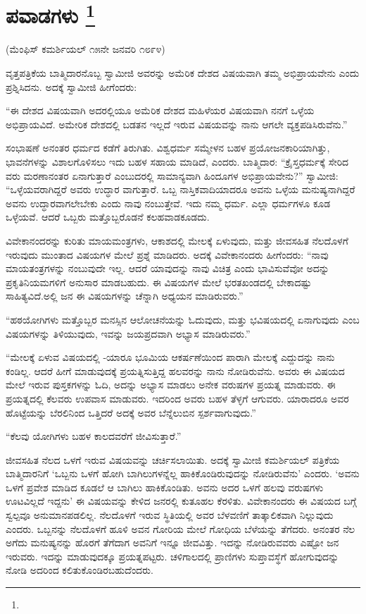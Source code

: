 
\chapter[ಪವಾಡಗಳು ]{ಪವಾಡಗಳು \protect\footnote{}}

\centerline{(ಮೆಂಫಿಸ್​ ಕಮರ್ಶಿಯಲ್​ ೧೫ನೇ ಜನವರಿ ೧೮೯೪)}

ವೃತ್ತಪತ್ರಿಕೆಯ ಬಾತ್ಮಿದಾರನೊಬ್ಬ ಸ್ವಾಮೀಜಿ ಅವರನ್ನು ಅಮೆರಿಕ ದೇಶದ ವಿಷಯವಾಗಿ ತಮ್ಮ ಅಭಿಪ್ರಾಯವೇನು ಎಂದು ಪ್ರಶ್ನಿಸಿದನು. ಅದಕ್ಕೆ ಸ್ವಾಮೀಜಿ ಹೀಗೆಂದರು:

“ಈ ದೇಶದ ವಿಷಯವಾಗಿ ಅದರಲ್ಲಿಯೂ ಅಮೆರಿಕ ದೇಶದ ಮಹಿಳೆಯರ ವಿಷಯವಾಗಿ ನನಗೆ ಒಳ್ಳೆಯ ಅಭಿಪ್ರಾಯವಿದೆ. ಅಮೇರಿಕ ದೇಶದಲ್ಲಿ ಬಡತನ ಇಲ್ಲದೆ ಇರುವ ವಿಷಯವನ್ನು ನಾನು ಆಗಲೇ ವ್ಯಕ್ತಪಡಿಸಿರುವೆನು.”

ಸಂಭಾಷಣೆ ಅನಂತರ ಧರ್ಮದ ಕಡೆಗೆ ತಿರುಗಿತು. ವಿಶ್ವಧರ್ಮ ಸಮ್ಮೇಳನ ಬಹಳ ಪ್ರಯೋಜನಕಾರಿಯಾಗಿತ್ತು, ಭಾವನೆಗಳನ್ನು ವಿಶಾಲಗೊಳಿಸಲು ಇದು ಬಹಳ ಸಹಾಯ ಮಾಡಿದೆ, ಎಂದರು. ಬಾತ್ಮಿದಾರ: “ಕ್ರೈಸ್ತಧರ್ಮಕ್ಕೆ ಸೇರಿದ ವರು ಮರಣಾನಂತರ ಏನಾಗುತ್ತಾರೆ ಎಂಬುದರಲ್ಲಿ ಸಾಮಾನ್ಯವಾಗಿ ಹಿಂದೂಗಳ ಅಭಿಪ್ರಾಯವೇನು?” ಸ್ವಾಮೀಜಿ: “ಒಳ್ಳೆಯವರಾಗಿದ್ದರೆ ಅವರು ಉದ್ಧಾರ ವಾಗುತ್ತಾರೆ. ಒಬ್ಬ ನಾಸ್ತಿಕವಾದಿಯಾದರೂ ಅವನು ಒಳ್ಳೆಯ ಮನುಷ್ಯನಾಗಿದ್ದರೆ ಅವನು ಉದ್ಧಾರವಾಗಲೇಬೇಕು ಎಂದು ನಾವು ನಂಬುತ್ತೇವೆ. ಇದು ನಮ್ಮ ಧರ್ಮ. ಎಲ್ಲಾ ಧರ್ಮಗಳೂ ಕೂಡ ಒಳ್ಳೆಯವೆ. ಆದರೆ ಒಬ್ಬರು ಮತ್ತೊಬ್ಬರೊಡನೆ ಕಲಹವಾಡಕೂಡದು.

ವಿವೇಕಾನಂದರನ್ನು ಕುರಿತು ಮಾಯಮಂತ್ರಗಳು, ಆಕಾಶದಲ್ಲಿ ಮೇಲಕ್ಕೆ ಏಳುವುದು, ಮತ್ತು ಜೀವಸಹಿತ ನೆಲದೊಳಗೆ ಇರುವುದು ಮುಂತಾದ ವಿಷಯಗಳ ಮೇಲೆ ಪ್ರಶ್ನೆ ಮಾಡಿದರು. ಅದಕ್ಕೆ ವಿವೇಕಾನಂದರು ಹೀಗೆಂದರು: “ನಾವು ಮಾಯತಂತ್ರಗಳನ್ನು ನಂಬುವುದೇ ಇಲ್ಲ. ಆದರೆ ಯಾವುದನ್ನು ನಾವು ವಿಚಿತ್ರ ಎಂದು ಭಾವಿಸುವೆವೋ ಅದನ್ನು ಪ್ರಕೃತಿನಿಯಮಗಳಿಗೆ ಅನುಸಾರ ಮಾಡಬಹುದು. ಈ ವಿಷಯಗಳ ಮೇಲೆ ಭರತಖಂಡದಲ್ಲಿ ಬೇಕಾದಷ್ಟು ಸಾಹಿತ್ಯವಿದೆ.ಅಲ್ಲಿ ಜನ ಈ ವಿಷಯಗಳನ್ನು ಚೆನ್ನಾಗಿ ಅಧ್ಯಯನ ಮಾಡಿರುವರು.”

“ಹಠಯೋಗಿಗಳು ಮತ್ತೊಬ್ಬರ ಮನಸ್ಸಿನ ಆಲೋಚನೆಯನ್ನು ಓದುವುದು, ಮತ್ತು ಭವಿಷಯದಲ್ಲಿ ಏನಾಗುವುದು ಎಂಬ ವಿಷಯಗಳನ್ನು ತಿಳಿಯುವುದು, ಇವನ್ನು ಜಯಪ್ರದವಾಗಿ ಅಭ್ಯಾಸ ಮಾಡಿರುವರು.”

“ಮೇಲಕ್ಕೆ ಏಳುವ ವಿಷಯದಲ್ಲಿ -ಯಾರೂ ಭೂಮಿಯ ಆಕರ್ಷಣೆಯಿಂದ ಪಾರಾಗಿ ಮೇಲಕ್ಕೆ ಎದ್ದುದನ್ನು ನಾನು ಕಂಡಿಲ್ಲ. ಆದರೆ ಹೀಗೆ ಮಾಡುವುದಕ್ಕೆ ಪ್ರಯತ್ನಿಸುತ್ತಿದ್ದ ಹಲವರನ್ನು ನಾನು ನೋಡಿರುವೆನು. ಅವರು ಈ ವಿಷಯದ ಮೇಲೆ ಇರುವ ಪುಸ್ತಕಗಳನ್ನು ಓದಿ, ಅದನ್ನು ಅಭ್ಯಾಸ ಮಾಡಲು ಅನೇಕ ವರುಷಗಳ ಪ್ರಯತ್ನ ಮಾಡುವರು. ಈ ಪ್ರಯತ್ನದಲ್ಲಿ ಕೆಲವರು ಉಪವಾಸ ಮಾಡುವರು. ಇದರಿಂದ ಅವರು ಬಹಳ ತೆಳ್ಳಗೆ ಆಗುವರು. ಯಾರಾದರೂ ಅವರ ಹೊಟ್ಟೆಯನ್ನು ಬೆರಲಿನಿಂದ ಒತ್ತಿದರೆ ಅದಕ್ಕೆ ಅವರ ಬೆನ್ನೆಲುಬಿನ ಸ್ಪರ್ಶವಾಗುವುದು.”

“ಕೆಲವು ಯೋಗಿಗಳು ಬಹಳ ಕಾಲದವರೆಗೆ ಜೀವಿಸುತ್ತಾರೆ.”

ಜೀವಸಹಿತ ನೆಲದ ಒಳಗೆ ಇರುವ ವಿಷಯವನ್ನು ಚರ್ಚಿಸಲಾಯಿತು. ಅದಕ್ಕೆ ಸ್ವಾಮೀಜಿ ಕಮರ್ಶಿಯಲ್​ ಪತ್ರಿಕೆಯ ಬಾತ್ಮಿದಾರನಿಗೆ ‘ಒಬ್ಬನು ಒಳಗೆ ಹೋಗಿ ಬಾಗಿಲುಗಳನ್ನೆಲ್ಲ ಹಾಕಿಕೊಂಡಿರುವುದನ್ನು ನೋಡಿರುವೆನು’ ಎಂದರು. ‘ಅವನು ಒಳಗೆ ಪ್ರವೇಶ ಮಾಡಿದ ಕೂಡಲೆ ಆ ಬಾಗಿಲು ಹಾಕಿಕೊಂಡಿತು. ಅವನು ಅದರ ಒಳಗೆ ಹಲವು ವರುಷಗಳು ಊಟವಿಲ್ಲದೆ ಇದ್ದನು’ ಈ ವಿಷಯವನ್ನು ಕೇಳಿದ ಜನರಲ್ಲಿ ಕುತೂಹಲ ಕೆರಳಿತು. ವಿವೇಕಾನಂದರು ಈ ವಿಷಯದ ಬಗ್ಗೆ ಸ್ವಲ್ಪವೂ ಅನುಮಾನಪಡಲಿಲ್ಲ. ನೆಲದೊಳಗೆ ಇರುವ ಸ್ಥಿತಿಯಲ್ಲಿ ಅವರ ಬೆಳವಣಿಗೆ ತಾತ್ಕಾಲಿಕವಾಗಿ ನಿಲ್ಲುವುದು ಎಂದರು. ಒಬ್ಬನನ್ನು ನೆಲದೊಳಗೆ ಹೂಳಿ ಅವನ ಗೋರಿಯ ಮೇಲೆ ಗೋಧಿಯ ಬೆಳೆಯನ್ನು ತೆಗೆದರು. ಅನಂತರ ನೆಲ ಅಗೆದು ಮನುಷ್ಯನನ್ನು ಹೊರಗೆ ತೆಗೆದಾಗ ಅವನಿಗೆ ಇನ್ನೂ ಜೀವವಿತ್ತು. ಇದನ್ನು ನೋಡಿರುವವರು ಎಷ್ಟೋ ಜನ ಇರುವರು. ಇದನ್ನು ಮಾಡುವುದಕ್ಕೂ ಪ್ರಯತ್ನಪಟ್ಟರು. ಚಳಿಗಾಲದಲ್ಲಿ ಪ್ರಾಣಿಗಳು ಸುಪ್ತಾವಸ್ಥೆಗೆ ಹೋಗುವುದನ್ನು ನೋಡಿ ಅದರಿಂದ ಕಲಿತುಕೊಂಡಿರಬಹುದೆಂದರು.

